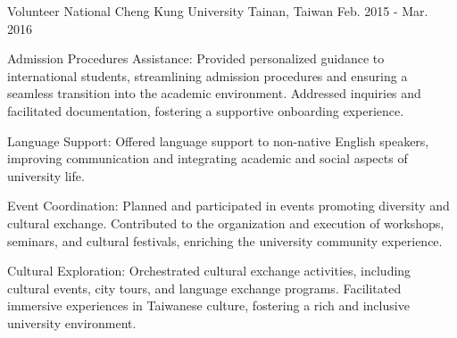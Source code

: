 \begin{cventries}
  \cventry
    {Volunteer} %
    {National Cheng Kung University} %
    {Tainan, Taiwan} %
    {Feb. 2015 - Mar. 2016} %
    {
      \begin{cvitems} %
        \item {Admission Procedures Assistance: Provided personalized guidance to international students, streamlining admission procedures and ensuring a seamless transition into the academic environment. Addressed inquiries and facilitated documentation, fostering a supportive onboarding experience.}
        \item {Language Support: Offered language support to non-native English speakers, improving communication and integrating academic and social aspects of university life.}
        \item {Event Coordination: Planned and participated in events promoting diversity and cultural exchange. Contributed to the organization and execution of workshops, seminars, and cultural festivals, enriching the university community experience.}
        \item {Cultural Exploration: Orchestrated cultural exchange activities, including cultural events, city tours, and language exchange programs. Facilitated immersive experiences in Taiwanese culture, fostering a rich and inclusive university environment.}
      \end{cvitems}
    }

\end{cventries}

